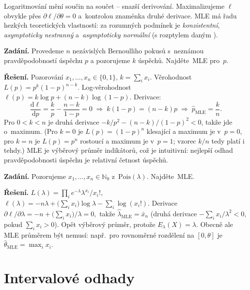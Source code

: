 \documentclass[11pt,a4paper]{article}
\newcommand{\N}{\mathbb{N}}
\begin{document}
\begin{intuice}
Logaritmování mění součin na součet -- snazší derivování. Maximalizujeme $\ell$ obvykle přes $\partial\ell/\partial\theta=0$ a~kontrolou znaménka druhé derivace. MLE má řadu hezkých teoretických vlastností: za rozumných podmínek je \emph{konzistentní}, \emph{asymptoticky nestranný} a~\emph{asymptoticky normální} (s rozptylem daným ).
\end{intuice}

\begin{priklad}
\textbf{Zadání.} Provedeme $n$ nezávislých Bernoulliho pokusů s~neznámou pravděpodobností úspěchu $p$ a pozorujeme $k$ úspěchů. Najděte~MLE pro~$p$.

\textbf{Řešení.} Pozorování $x_1,\dots,x_n\in\{0,1\}$, $k=\sum_i x_i$. Věrohodnost
\(
L(p)=p^k(1-p)^{n-k}.
\)
Log-věrohodnost $\ell(p)=k\log p+(n-k)\log(1-p)$. Derivace:
\[
\frac{\mathrm{d}\ell}{\mathrm{d}p}=\frac{k}{p}-\frac{n-k}{1-p}=0\;\Longrightarrow\;k(1-p)=(n-k)p\;\Longrightarrow\;\boxed{\hat p_{\mathrm{MLE}}=\frac{k}{n}}.
\]
Pro $0<k<n$ je druhá derivace $-k/p^2-(n-k)/(1-p)^2<0$, takže jde o~maximum. (Pro $k=0$ je $L(p)=(1-p)^n$ klesající a maximum je v~$p=0$, pro $k=n$ je $L(p)=p^n$ rostoucí a maximum je v~$p=1$; vzorec $k/n$ tedy platí i tehdy.) MLE je výběrový průměr indikátorů, což je intuitivní: nejlepší odhad pravděpodobnosti úspěchu je relativní četnost úspěchů.
\end{priklad}

\begin{priklad}
\textbf{Zadání.} Pozorujeme $x_1,\dots,x_n\in\N_0$ z~$\mathrm{Pois}(\lambda)$. Najděte~MLE.

\textbf{Řešení.} $L(\lambda)=\prod_i e^{-\lambda}\lambda^{x_i}/x_i!$, $\ell(\lambda)=-n\lambda+\bigl(\sum_i x_i\bigr)\log\lambda-\sum_i\log(x_i!)$. Derivace
\(
\partial\ell/\partial\lambda=-n+\bigl(\sum_i x_i\bigr)/\lambda=0,
\)
takže $\hat\lambda_{\mathrm{MLE}}=\bar x_n$ (druhá derivace $-\sum_i x_i/\lambda^2<0$, pokud $\sum_i x_i>0$). Opět výběrový průměr, protože $E_\lambda(X)=\lambda$. Obecně ale MLE průměrem být nemusí: např.\ pro rovnoměrné rozdělení na $[0,\theta]$ je $\hat\theta_{\mathrm{MLE}}=\max_i x_i$.
\end{priklad}

\section{Intervalové odhady}
\end{document}
